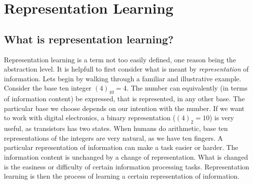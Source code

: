 \documentclass[../../thesis.tex]{subfiles}
\begin{document}




\section{Representation Learning}

\cite{Rep-rev-persp}

\subsection{What is representation learning?}
Representation learning is a term not too easily defined, one reason being the abstraction level. It is helpfull to first consider what is meant by \textit{representation} of information. Lets begin by walking through a familiar and illustrative example. Consider the base ten integer $(4)_{10} = 4$. The number can equivalently (in terms of information content) be expressed, that is represented, in any other base. The particular base we choose depends on our intention with the number. If we want to work with digital electronics, a binary representation ($(4)_{2} = 10$) is very useful, as transistors has two states. When humans do arithmetic, base ten representations of the integers are very natural, as we have ten fingers. A particular representation of information can make a task easier or harder. The information content is unchanged by a change of representation. What is changed is the easiness or difficulty of certain information processing tasks. Representation learning is then the process of learning a certain representation of information. \\\\
\end{document}
